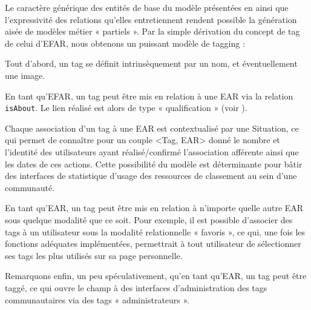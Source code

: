 \startchapter[title={Le modèle de tags},reference=model:tags]


Le caractère générique des entités de base du modèle présentées en  ainsi que l'expressivité des relations qu'elles entretiennent rendent possible la génération aisée de modèles métier « partiels ».
Par la simple dérivation du concept de tag de celui d'EFAR, nous obtenons un puissant modèle de tagging :

\startitemize
\item Tout d'abord, un tag se définit intrinsèquement par un nom, et éventuellement une image.
\item En tant qu'EFAR, un tag peut être mis en relation à une EAR via la relation {\tt isAbout}. Le lien réalisé est alors de type « qualification » (voir ).
\item Chaque association d'un tag à une EAR est contextualisé par une Situation, ce qui permet de connaître pour un couple <Tag, EAR> donné le nombre et l'identité des utilisateurs ayant réalisé/confirmé l'association afférente ainsi que les dates de ces actions. Cette possibilité du modèle est déterminante pour bâtir des interfaces de statistique d'usage des ressources de classement au sein d'une communauté.
\item En tant qu'EAR, un tag peut être mis en relation à n'importe quelle autre EAR sous quelque modalité que ce soit. Pour exemple, il est possible d'associer des tags à un utilisateur sous la modalité relationnelle « favoris », ce qui, une fois les fonctions adéquates implémentées, permettrait à tout utilisateur de sélectionner ses tags les plus utilisés sur sa page personnelle.
\item Remarquons enfin, un peu spéculativement, qu'en tant qu'EAR, un tag peut être taggé, ce qui ouvre le champ à des interfaces d'administration des tags communautaires via des tags « administrateurs ».
\stopitemize

\stopchapter